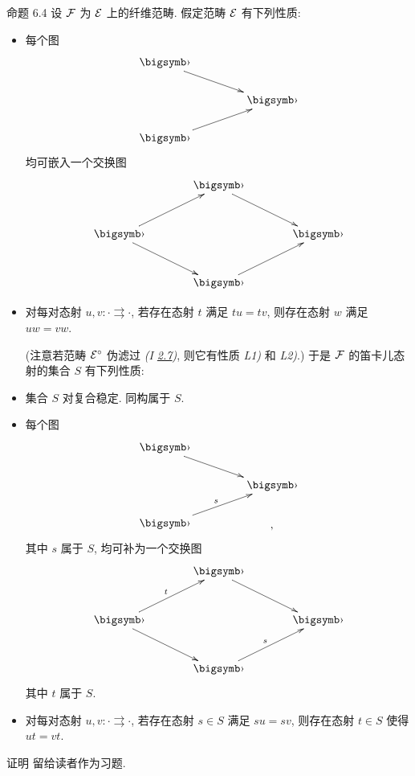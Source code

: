\begin{enonce*}{命题 6.4}
设 ${\mathcal F}$ 为 ${\mathcal E}$ 上的纤维范畴.
假定范畴 ${\mathcal E}$ 有下列性质:
\begin{itemize}
\item[L1)] 每个图
\[
\xymatrix@C=1.5cm@R=.65cm{
\bigdot \ar[rd]& \\
        & \bigdot\\
\bigdot \ar[ru]&
}
\]
均可嵌入一个交换图
\[
\xymatrix@C=1.25cm@R=1cm{
        & \bigdot \ar[rd]&\\
\bigdot \ar[ru]\ar[rd]&         & \bigdot\\
        & \bigdot \ar[ru]&
}
\]

\item[L2)] 对\pageoriginale 每对态射 $u,v:\cdot\rightrightarrows\cdot$,
若存在态射 $t$ 满足 $tu=tv$, 则存在态射 $w$ 满足 $uw=vw$.

(注意若范畴 ${\mathcal E}^{\circ}$ 伪滤过 \emph{(I \hyperref[I.def2.7]{2.7})},
则它有性质 \emph{L1)} 和 \emph{L2)}.)
于是 ${\mathcal F}$ 的笛卡儿态射的集合 $S$ 有下列性质:

\item[Fr1)] 集合 $S$ 对复合稳定. 同构属于 $S$.

\item[Fr2)] 每个图
\[
\xymatrix@C=1.5cm@R=.65cm{
\bigdot \ar[rd]& \\
        & \bigdot\\
\bigdot \ar[ru]^{s}&,
}
\]
其中 $s$ 属于 $S$, 均可补为一个交换图
\[
\xymatrix@C=1.25cm@R=1cm{
        & \bigdot \ar[rd]&\\
\bigdot \ar[ru]^{t}\ar[rd]&         & \bigdot\\
        & \bigdot \ar[ru]^{s}&
}
\]
其中 $t$ 属于 $S$.

\item[Fr3)] 对每对态射 $u,v:\cdot\rightrightarrows\cdot$,
若存在态射 $s\in S$ 满足 $su=sv$,
则存在态射 $t\in S$ 使得 $ut=vt$.
\end{itemize}
\end{enonce*}

\begin{enonce*}[remark]{证明}
留给读者作为习题.
\end{enonce*}

